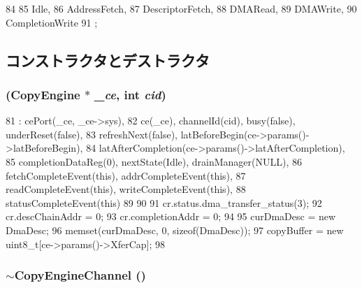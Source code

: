 \begin{DoxyCode}
84                           {
85             Idle,
86             AddressFetch,
87             DescriptorFetch,
88             DMARead,
89             DMAWrite,
90             CompletionWrite
91         };
\end{DoxyCode}


\subsection{コンストラクタとデストラクタ}
\hypertarget{classCopyEngine_1_1CopyEngineChannel_a407c12791405657ab18510c2141828fe}{
\subsubsection[{CopyEngineChannel}]{ ({\bf CopyEngine} $\ast$ {\em \_\-ce}, \/  int {\em cid})}}
\label{classCopyEngine_1_1CopyEngineChannel_a407c12791405657ab18510c2141828fe}



\begin{DoxyCode}
81     : cePort(_ce, _ce->sys),
82       ce(_ce), channelId(cid), busy(false), underReset(false),
83     refreshNext(false), latBeforeBegin(ce->params()->latBeforeBegin),
84     latAfterCompletion(ce->params()->latAfterCompletion),
85     completionDataReg(0), nextState(Idle), drainManager(NULL),
86     fetchCompleteEvent(this), addrCompleteEvent(this),
87     readCompleteEvent(this), writeCompleteEvent(this),
88     statusCompleteEvent(this)
89 
90 {
91         cr.status.dma_transfer_status(3);
92         cr.descChainAddr = 0;
93         cr.completionAddr = 0;
94 
95         curDmaDesc = new DmaDesc;
96         memset(curDmaDesc, 0, sizeof(DmaDesc));
97         copyBuffer = new uint8_t[ce->params()->XferCap];
98 }
\end{DoxyCode}
\hypertarget{classCopyEngine_1_1CopyEngineChannel_a9d13764944deaf17eb431f30157545ca}{
\subsubsection[{$\sim$CopyEngineChannel}]{\setlength{\rightskip}{0pt plus 5cm}$\sim${\bf CopyEngineChannel} ()}}
\label{classCopyEngine_1_1CopyEngineChannel_a9d13764944deaf17eb431f30157545ca}



